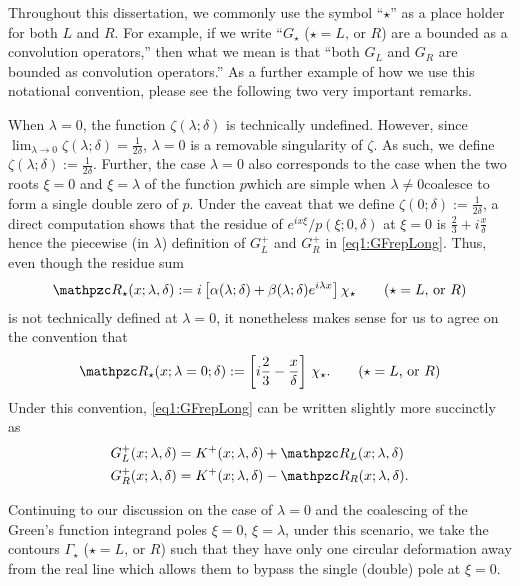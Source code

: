 \documentclass[../dissertation.tex]{subfiles}
\begin{document}
\begin{rmk}\label{rmk1:StarNotation}
	Throughout this dissertation, we commonly use the symbol ``$\star$''
	as a place holder for both $L$ and $R$. For example, if we write ``$G_\star$ 
	($\star = L \text{, or } R$) are a bounded as a convolution operators,'' then 
	what we mean is that ``both $G_L$ and $G_R$ are bounded as convolution 
	operators.'' As a further example of how we use this notational convention, 
	please see the following two very important remarks.
\end{rmk}




\begin{rmk}\label{rmk1:ResidueLimits}
	When $\lambda = 0$, the function $\zeta(\lambda; \delta)$ is technically 
	undefined. However, since 
	$\lim_{\lambda\to0}\zeta(\lambda; \delta) = \frac{1}{2\delta}$, $\lambda = 0$
	is a removable singularity of $\zeta$. As such, we define 
	$\zeta(\lambda; \delta) := \frac{1}{2\delta}$. Further, the case $\lambda=0$ 
	also corresponds to the case when the two roots $\xi = 0$ and $\xi = \lambda$ 
	of the function $p$\textemdash{}which are simple when 
	$\lambda \ne 0$\textemdash{}coalesce to form a single double zero of $p$. Under 
	the caveat that we define $\zeta(0; \delta):= \frac{1}{2\delta}$, a direct computation 
	shows that the residue of $e^{ix\xi} / p(\xi; 0, \delta)$ at $\xi = 0$ is 
	$\frac{2}{3} + i \frac{x}{\delta}$\textemdash{}hence the piecewise (in $\lambda$)
	definition of $G_L^+$ and $G_R^+$ in \eqref{eq1:GFrepLong}.
	Thus, even though the residue sum 
	\[
		\mathpzc R_\star (x; \lambda, \delta) 
			:= i 
				\left[
					\alpha(\lambda; \delta) + \beta(\lambda; \delta) e^{i\lambda x}
				\right] \chi_\star
			\qquad (\star = L \text{, or } R)
	\]
	is not technically defined at 
	$\lambda = 0$, it nonetheless makes sense for us to agree on the convention 
	that
	\[
		\mathpzc R_\star(x; \lambda = 0; \delta)
			:= \left[ i \frac{2}{3} - \frac{x}{\delta} \right] \, \chi_\star.
		\qquad (\star = L \text{, or } R)
	\]
	Under this convention, \eqref{eq1:GFrepLong} can be written slightly more succinctly as
	\begin{subequations}
		\label{eq1:GFrep}
		\begin{align}
			\label{eq1:GLrep}
			G_L^+(x; \lambda, \delta)
				&=
					K^+(x; \lambda, \delta) 
					+ \mathpzc R_L(x; \lambda, \delta)\\
			\label{eq1:GRrep}
			G_R^+(x; \lambda, \delta) &= 
				K^+(x; \lambda, \delta) 
					- \mathpzc R_R(x; \lambda, \delta).
		\end{align}
	\end{subequations}
\end{rmk}




\begin{rmk}\label{rmk1:ContourAdjustment}
	Continuing to our discussion on the case of $\lambda = 0$ and the 
	coalescing of the Green's function integrand poles $\xi = 0$, $\xi = \lambda$,
	under this scenario, we take the contours $\Gamma_\star$ 
	($\star = L \text{, or } R$) such that they have only one circular deformation
	away from the real line which allows them to bypass the single (double) pole
	at $\xi = 0$. 
\end{rmk}
\end{document}
